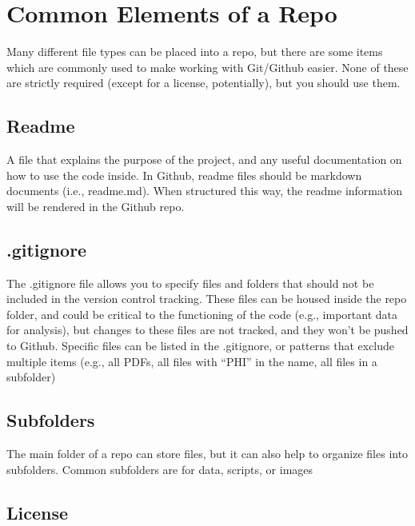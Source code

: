 \documentclass[
  letterpaper,
  DIV=11,
  numbers=noendperiod]{scrreprt}
\begin{document}
\hypertarget{common-elements-of-a-repo}{%
\section{Common Elements of a Repo}\label{common-elements-of-a-repo}}

Many different file types can be placed into a repo, but there are some
items which are commonly used to make working with Git/Github easier.
None of these are strictly required (except for a license, potentially),
but you should use them.

\hypertarget{readme}{%
\subsection{Readme}\label{readme}}

A file that explains the purpose of the project, and any useful
documentation on how to use the code inside. In Github, readme files
should be markdown documents (i.e., readme.md). When structured this
way, the readme information will be rendered in the Github repo.

\hypertarget{gitignore}{%
\subsection{.gitignore}\label{gitignore}}

The .gitignore file allows you to specify files and folders that should
not be included in the version control tracking. These files can be
housed inside the repo folder, and could be critical to the functioning
of the code (e.g., important data for analysis), but changes to these
files are not tracked, and they won't be pushed to Github. Specific
files can be listed in the .gitignore, or patterns that exclude multiple
items (e.g., all PDFs, all files with ``PHI'' in the name, all files in
a subfolder)

\hypertarget{subfolders}{%
\subsection{Subfolders}\label{subfolders}}

The main folder of a repo can store files, but it can also help to
organize files into subfolders. Common subfolders are for data, scripts,
or images

\hypertarget{license}{%
\subsection{License}\label{license}}
\end{document}
